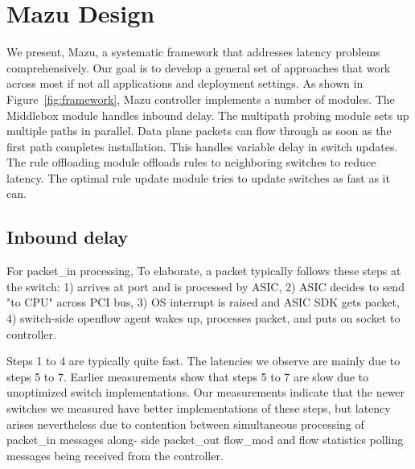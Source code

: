 \documentclass[onecolumn]{sig-alternate-10pt-onecolumn}
\begin{document}
\section{Mazu Design}
We present, Mazu, a systematic framework that addresses latency problems
comprehensively. 
Our goal is to develop a general set of approaches that work across most if not
all applications and deployment settings. 
As shown in Figure~\ref{fig:framework}, Mazu controller implements a number of
modules. The Middlebox module handles inbound delay. The multipath probing
module sets up multiple paths in parallel. Data plane packets can flow through as
soon as the first path completes installation. This handles variable delay in
switch updates. The rule offloading module offloads rules to neighboring
switches to reduce latency. The optimal rule update module tries to update
switches as fast as it can.

\subsection{Inbound delay}
For packet\_in processing, 
To elaborate, a packet typically follows these steps at the switch: 1)
arrives at port and is processed by ASIC, 2) ASIC decides to send "to
CPU" across PCI bus, 3) OS interrupt is raised and ASIC SDK gets
packet, 4) switch-side openflow agent wakes up, processes packet, and
puts on socket to controller.


Steps 1 to 4 are typically quite fast. The latencies we observe are mainly due to
steps 5 to 7. Earlier measurements show that steps 5 to 7 are slow due to
unoptimized switch implementations. Our measurements indicate that the newer
switches we measured have better implementations of these steps, but latency
arises nevertheless due to contention between simultaneous processing of
packet\_in messages along- side packet\_out flow\_mod and flow statistics
polling messages being received from the controller. 
 
\end{document}

